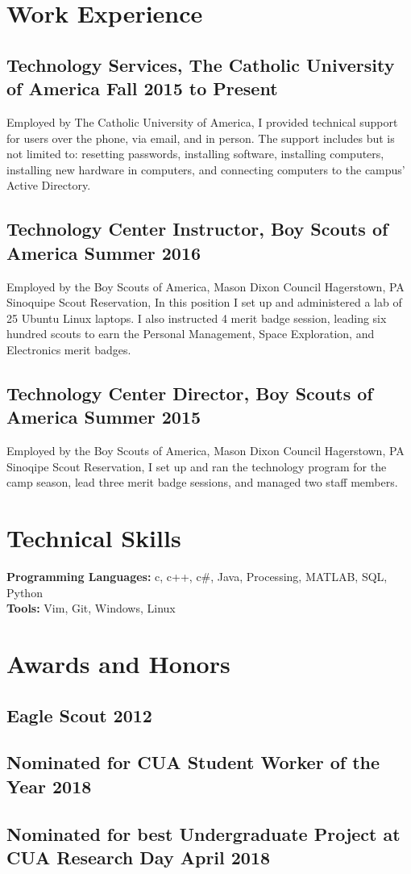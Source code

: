 \documentclass{article}
\begin{document}
\section{Work Experience}
\subsection{Technology Services, The Catholic University of America \hfill Fall 2015 to Present}
Employed by The Catholic University of America,
I provided technical support for users over the phone, via email, and in person.
The support includes but is not limited to:
resetting passwords,
installing software,
installing computers,
installing new hardware in computers,
and
connecting computers to the campus' Active Directory.

\subsection{Technology Center Instructor, Boy Scouts of America \hfill Summer 2016}
Employed by the Boy Scouts of America, Mason Dixon Council Hagerstown, PA Sinoquipe Scout Reservation,
In this position I set up and administered a lab of 25 Ubuntu Linux laptops.
I also instructed 4 merit badge session, leading six hundred scouts to earn the
Personal Management,
Space Exploration,
and
Electronics
merit badges.
\subsection{Technology Center Director, Boy Scouts of America \hfill Summer 2015}
Employed by the Boy Scouts of America, Mason Dixon Council Hagerstown, PA Sinoqipe Scout Reservation,
I set up and ran the technology program for the camp season,
lead three merit badge sessions,
and managed two staff members.
\section{Technical Skills}
\textbf{Programming Languages:}
c,
c++,
c\#,
Java,
Processing,
MATLAB,
SQL,
Python \\
\textbf{Tools:}
Vim,
Git,
Windows,
Linux

\section{Awards and Honors}
\subsection{Eagle Scout \hfill 2012}
\subsection{Nominated for CUA Student Worker of the Year \hfill 2018}
\subsection{Nominated for best Undergraduate Project at CUA Research Day \hfill April 2018}
\end{document}
